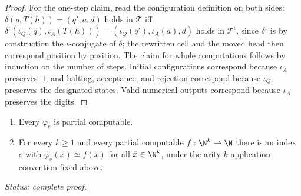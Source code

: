 \begin{proof}
For the one-step claim, read the configuration definition on both sides:
\(\delta(q,T(h))=(q',a,d)\) holds in \(\mathcal T\) iff
\(\delta^{\iota}(\iota_Q(q),\iota_A(T(h)))
=(\iota_Q(q'),\iota_A(a),d)\) holds in \(\mathcal T^{\iota}\), since
\(\delta^{\iota}\) is by construction the \(\iota\)-conjugate of \(\delta\);
the rewritten cell and the moved head then correspond position by position.
The claim for whole computations follows by induction on the number of
steps.  Initial configurations correspond because \(\iota_A\) preserves
\(\sqcup\), and halting, acceptance, and rejection correspond because
\(\iota_Q\) preserves the designated states.  Valid numerical outputs
correspond because \(\iota_A\) preserves the digits.
\end{proof}

\begin{theorem}
\label{thm:enumeration}
\begin{enumerate}[label=(\alph*)]
\item Every \(\varphi_e\) is partial computable.
\item For every \(k\geq1\) and every partial computable
      \(f:\N^k\rightharpoonup\N\) there is an index \(e\) with
      \(\varphi_e(\bar x)\simeq f(\bar x)\) for all \(\bar x\in\N^k\),
      under the arity-\(k\) application convention fixed above.
\end{enumerate}
\textit{Status: complete proof.}
\end{theorem}

